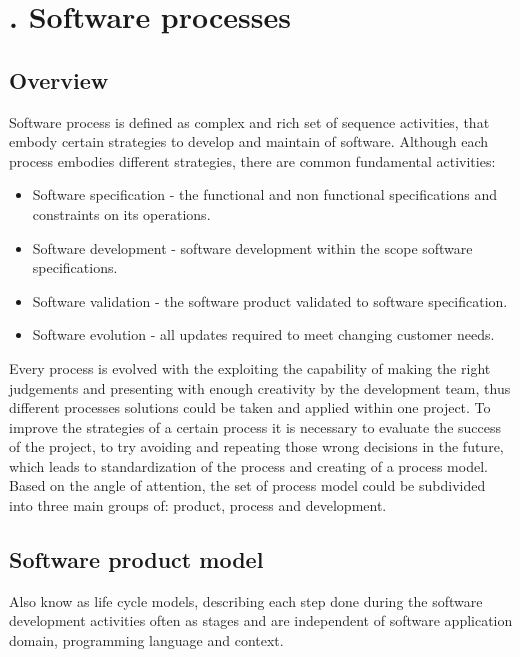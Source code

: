\chapter[Software processes]{\thechapter. Software processes}
\section{Overview}
Software process is defined as complex and rich set of sequence activities, that embody certain strategies to develop and maintain of software. Although each process embodies different strategies, there are common fundamental activities:
\begin{itemize}
\item Software specification - the functional and non functional specifications and constraints on its operations.
\item Software development - software development within the scope software specifications.
\item Software validation - the software product validated to software specification.
\item Software evolution - all updates required to meet changing customer needs.
\end{itemize}
Every process is evolved with the exploiting the capability of making the right judgements and presenting with enough creativity by the development team, thus different processes solutions could be taken and applied within one project. To improve the strategies of a certain process it is necessary to evaluate the success of the project, to try avoiding and repeating those wrong decisions in the future, which leads to standardization of the process and creating of a process model.\\ 
Based on the angle of attention, the set of process model could be subdivided into three main groups of: product, process and development.
\newpage
\section{Software product model} 
Also know as life cycle models, describing each step done during the software development activities often as stages and are independent of software application domain, programming language and context. 
